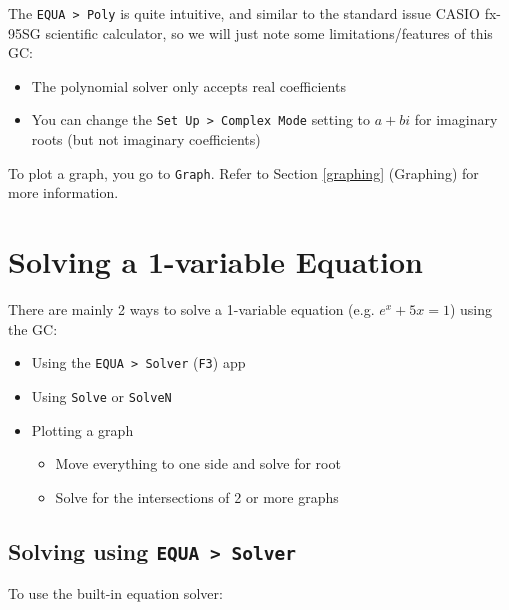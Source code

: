 \documentclass[a5paper,draft]{memoir}
\def\code#1{\texttt{#1}}
\def\Fone{(\code{F1}) }
\def\Fthree{(\code{F3}) }
\def\Fsix{(\code{F6}) }
\begin{document}
The \code{EQUA > Poly} is quite intuitive, and similar to the standard issue CASIO fx-95SG scientific calculator, so we will just note some limitations/features of this GC:
\begin{itemize}
	\item The polynomial solver only accepts real coefficients
	\item You can change the \code{Set Up > Complex Mode} setting to \code{$a+bi$} for imaginary roots (but not imaginary coefficients)
\end{itemize}

To plot a graph, you go to \code{Graph}. Refer to Section \ref{graphing} (Graphing) for more information.

\section{Solving a 1-variable Equation}
There are mainly 2 ways to solve a 1-variable equation (e.g. $e^x + 5x = 1$) using the GC:
\begin{itemize}
	\item Using the \code{EQUA > Solver} \Fthree app
	\item Using \code{Solve} or \code{SolveN}
	\item Plotting a graph
	\begin{itemize}
		\item Move everything to one side and solve for root
		\item Solve for the intersections of 2 or more graphs
	\end{itemize}
\end{itemize}

\subsection{Solving using \code{EQUA > Solver}}
To use the built-in equation solver:
\end{document}
